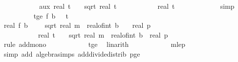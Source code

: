 \begin{isabellebody}
\ \ \ \ \ \ \ \ \isamarkupfalse%
\ \isamarkupfalse%
\ aux{\isacharcolon}{\kern0pt}\ {\isachardoublequoteopen}{\isacharparenleft}{\kern0pt}real\ t\ {\isacharplus}{\kern0pt}\ {}\ {\isacharasterisk}{\kern0pt}\ sqrt\ {\isacharparenleft}{\kern0pt}real\ t\ {\isacharslash}{\kern0pt}\ {\isacharparenleft}{\kern0pt}{}\ {\isacharminus}{\kern0pt}\ {\isasymdelta}{\isacharprime}{\kern0pt}{\isacharparenright}{\kern0pt}\ {\isacharplus}{\kern0pt}\ {}{\isacharparenright}{\kern0pt}{\isacharparenright}{\kern0pt}\ {\isacharasterisk}{\kern0pt}\ {\isacharparenleft}{\kern0pt}{}\ {\isacharminus}{\kern0pt}\ {\isasymdelta}{\isacharprime}{\kern0pt}{\isacharparenright}{\kern0pt}\ {\isasymle}\ real\ t\ {\isachardoublequoteclose}\isanewline
\ \ \ \ \ \ \ \ \ \ \isamarkupfalse%
\ simp\isanewline
\ \ \ \ \ \ \ \ \isamarkupfalse%
\ t{\isacharunderscore}{\kern0pt}ge{\isacharcolon}{\kern0pt}\ {\isachardoublequoteopen}f\ b\ {\isasymomega}\ {\isacharless}{\kern0pt}\ t{\isachardoublequoteclose}\isanewline
\ \ \ \ \ \ \ \ \isamarkupfalse%
\ {\isachardoublequoteopen}real\ {\isacharparenleft}{\kern0pt}f\ b\ {\isasymomega}{\isacharparenright}{\kern0pt}\ {\isacharplus}{\kern0pt}\ {}\ {\isacharasterisk}{\kern0pt}\ sqrt\ {\isacharparenleft}{\kern0pt}real\ m\ {\isacharasterisk}{\kern0pt}\ {\isacharparenleft}{\kern0pt}real{\isacharunderscore}{\kern0pt}of{\isacharunderscore}{\kern0pt}int\ b\ {\isacharplus}{\kern0pt}\ {}{\isacharparenright}{\kern0pt}\ {\isacharslash}{\kern0pt}\ real\ p{\isacharparenright}{\kern0pt}\ \isanewline
\ \ \ \ \ \ \ \ \ \ {\isasymle}\ real\ t\ {\isacharplus}{\kern0pt}\ {}\ {\isacharasterisk}{\kern0pt}\ sqrt\ {\isacharparenleft}{\kern0pt}real\ m\ {\isacharasterisk}{\kern0pt}\ real{\isacharunderscore}{\kern0pt}of{\isacharunderscore}{\kern0pt}int\ b\ {\isacharslash}{\kern0pt}\ real\ p\ {\isacharplus}{\kern0pt}\ {}{\isacharparenright}{\kern0pt}{\isachardoublequoteclose}\isanewline
\ \ \ \ \ \ \ \ \ \ \isamarkupfalse%
\ {\isacharparenleft}{\kern0pt}rule\ add{\isacharunderscore}{\kern0pt}mono{\isacharparenright}{\kern0pt}\isanewline
\ \ \ \ \ \ \ \ \ \ \isamarkupfalse%
\ t{\isacharunderscore}{\kern0pt}ge\ \isamarkupfalse%
\ linarith\isanewline
\ \ \ \ \ \ \ \ \ \ \isamarkupfalse%
\ m{\isacharunderscore}{\kern0pt}le{\isacharunderscore}{\kern0pt}p\ \isamarkupfalse%
\ {\isacharparenleft}{\kern0pt}simp\ add{\isacharcolon}{\kern0pt}\ algebra{\isacharunderscore}{\kern0pt}simps\ add{\isacharunderscore}{\kern0pt}divide{\isacharunderscore}{\kern0pt}distrib\ p{\isacharunderscore}{\kern0pt}ge{\isacharunderscore}{\kern0pt}{}{\isacharparenright}{\kern0pt}\isanewline

\end{isabellebody}
